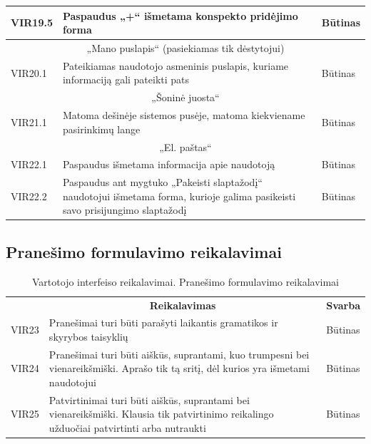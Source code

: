 \documentclass{VUMIFPSkursinis}
\begin{document}
\begin{longtable}{|p{2cm}|p{}|p{2cm}|}
{VIR19.5}&{Paspaudus „+“ išmetama konspekto pridėjimo forma}&{Būtinas}\\ \hline
\multicolumn{3}{|c|}{„Mano puslapis“ (pasiekiamas tik dėstytojui)}\\ \hline
{VIR20.1}&{Pateikiamas naudotojo asmeninis puslapis, kuriame informaciją gali pateikti pats}&{Būtinas}\\ \hline
\multicolumn{3}{|c|}{„Šoninė juosta“}\\ \hline
{VIR21.1}&{Matoma dešinėje sistemos pusėje, matoma kiekviename pasirinkimų lange}&{Būtinas}\\ \hline
\multicolumn{3}{|c|}{„El. paštas“}\\ \hline
{VIR22.1}&{Paspaudus išmetama informacija apie naudotoją}&{Būtinas}\\ \hline
{VIR22.2}&{Paspaudus ant mygtuko „Pakeisti slaptažodį“ naudotojui išmetama forma, kurioje galima pasikeisti savo prisijungimo slaptažodį}&{Būtinas}\\ \hline
\end{longtable}

\subsection{Pranešimo formulavimo reikalavimai}
\begin{table}[H]
	\caption{Vartotojo interfeiso reikalavimai. Pranešimo formulavimo reikalavimai}
	\begin{tabular}{|p{2cm}|p{}|p{2cm}|}
	\hline \rowcolor{lightgray} \multicolumn{3}{|c|}{5. Pranešimo formulavimo reikalavimai}\\	\hline 
\rowcolor{gray!50} \multicolumn{1}{|c|}{{\bfseries Kodas}}&\multicolumn{1}{c|}{{\bfseries Reikalavimas}}&\multicolumn{1}{c|}{{\bfseries Svarba}}\\ \hline
{VIR23}&	{Pranešimai turi būti parašyti laikantis gramatikos ir skyrybos taisyklių}&{Būtinas}\\ \hline	
{VIR24}&	{Pranešimai turi būti aiškūs, suprantami, kuo trumpesni bei vienareikšmiški. Aprašo tik tą sritį, dėl kurios yra išmetami naudotojui}&{Būtinas}\\ \hline	
{VIR25}&	{Patvirtinimai turi būti aiškūs, suprantami bei vienareikšmiški. Klausia tik patvirtinimo reikalingo užduočiai patvirtinti arba nutraukti}&{Būtinas}\\ \hline
\end{tabular}		
\end{table}
\end{document}
